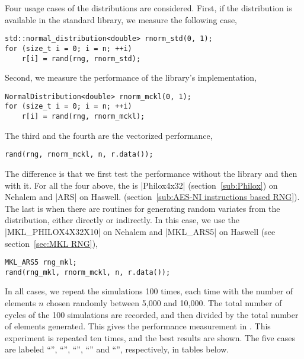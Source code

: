 Four usage cases of the distributions are considered. First, if the
distribution is available in the standard library, we measure the following
case,
\begin{verbatim}
std::normal_distribution<double> rnorm_std(0, 1);
for (size_t i = 0; i = n; ++i)
    r[i] = rand(rng, rnorm_std);
\end{verbatim}
Second, we measure the performance of the library's implementation,
\begin{verbatim}
NormalDistribution<double> rnorm_mckl(0, 1);
for (size_t i = 0; i = n; ++i)
    r[i] = rand(rng, rnorm_mckl);
\end{verbatim}
The third and the fourth are the vectorized performance,
\begin{verbatim}
rand(rng, rnorm_mckl, n, r.data());
\end{verbatim}
The difference is that we first test the performance without the \mkl \vml
library and then with it. For all the four above, the \rng is |Philox4x32|
(section~\ref{sub:Philox}) on Nehalem and |ARS| on Haswell.
(section~\ref{sub:AES-NI instructions based RNG}). The last is when there are
\mkl routines for generating random variates from the distribution, either
directly or indirectly. In this case, we use the \rng |MKL_PHILOX4X32X10| on
Nehalem and |MKL_ARS5| on Haswell (see section~\ref{sec:MKL RNG}),
\begin{verbatim}
MKL_ARS5 rng_mkl;
rand(rng_mkl, rnorm_mckl, n, r.data());
\end{verbatim}
In all cases, we repeat the simulations 100 times, each time with the number of
elements $n$ chosen randomly between 5,000 and 10,000. The total number of
cycles of the 100 simulations are recorded, and then divided by the total
number of elements generated. This gives the performance measurement in \cpe.
This experiment is repeated ten times, and the best results are shown. The five
cases are labeled ``\std'', ``\mckl'', ``\batch'', ``\vml'' and ``\mkl'',
respectively, in tables below.

\newpage









